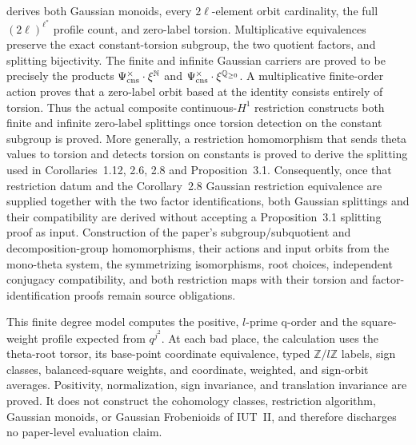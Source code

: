 \begin{definition}
  derives both Gaussian monoids, every \(2\ell\)-element orbit cardinality,
  the full \((2\ell)^{\ell^\ast}\) profile count, and zero-label torsion.
  Multiplicative equivalences preserve the exact
  constant-torsion subgroup, the two quotient factors, and splitting
  bijectivity.  The finite and infinite Gaussian carriers are proved to be
  precisely the products
  \(\Psi_{\rm cns}^{\times}\cdot\xi^{\mathbb N}\) and
  \(\Psi_{\rm cns}^{\times}\cdot\xi^{\mathbb Q_{\geq 0}}\).
  A multiplicative finite-order action proves that a zero-label orbit based at
  the identity consists entirely of torsion.  Thus the actual composite
  continuous-\(H^1\) restriction constructs both finite and infinite
  zero-label splittings once torsion detection on the constant subgroup is
  proved.  More generally, a restriction homomorphism that sends theta values to torsion and detects
  torsion on constants is proved to derive the splitting used in
  Corollaries~1.12, 2.6, 2.8 and Proposition~3.1.  Consequently, once that
  restriction datum and the Corollary~2.8 Gaussian restriction equivalence
  are supplied together with the two factor identifications, both Gaussian
  splittings and their compatibility are derived without accepting a
  Proposition~3.1 splitting proof as input.
  Construction of the paper's
  subgroup/subquotient and decomposition-group homomorphisms, their actions
  and input orbits from the mono-theta system, the symmetrizing isomorphisms,
  root choices, independent conjugacy compatibility, and both restriction
  maps with their torsion and factor-identification proofs remain source
  obligations.
\end{definition}

\begin{definition}
  \label{def:hodge-arakelov-concrete-pilots}
  \leanok
  This finite degree model computes the positive, \(l\)-prime q-order and
  the square-weight profile expected from \(q^{j^2}\).  At each bad place,
  the calculation uses the theta-root torsor, its base-point coordinate
  equivalence, typed
  \(\mathbb Z/l\mathbb Z\) labels, sign classes, balanced-square weights, and
  coordinate, weighted, and sign-orbit averages.  Positivity, normalization,
  sign invariance, and translation invariance are proved.  It does not
  construct the cohomology classes, restriction algorithm, Gaussian monoids,
  or Gaussian Frobenioids of IUT~II, and therefore discharges no paper-level
  evaluation claim.
\end{definition}


